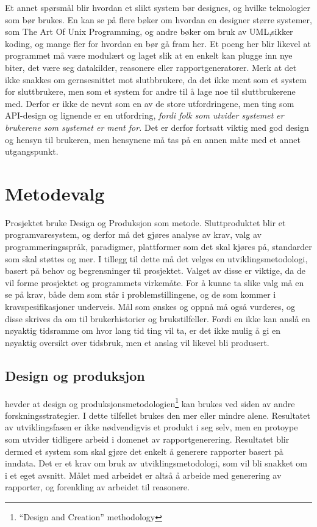 \documentclass[11pt]{article}
\begin{document}
Et annet spørsmål blir hvordan et slikt system bør designes, og hvilke teknologier som bør brukes. En kan se på flere bøker om hvordan en designer større systemer, som The Art Of Unix Programming\cite{taoup}, og andre bøker om bruk av UML\cite{Larman2005},sikker koding\cite{certguide}, og mange fler for hvordan en bør gå fram her. Et poeng her blir likevel at programmet må være modulært og laget slik at en enkelt kan plugge inn nye biter, det være seg datakilder, reasonere eller rapportgeneratorer. Merk at det ikke snakkes om gernsesnittet mot slutbbrukere, da det ikke ment som et system for sluttbrukere, men som et system for andre til å lage noe til sluttbrukerene med. Derfor er ikke de nevnt som en av de store utfordringene, men ting som API-design og lignende er en utfordring, \emph{fordi folk som utvider systemet er brukerene som systemet er ment for.} Det er derfor fortsatt viktig med god design og hensyn til brukeren, men hensynene må tas på en annen måte med et annet utgangspunkt.

\section{Metodevalg}
Prosjektet bruke Design og Produksjon som metode.
Sluttproduktet blir et programvaresystem, og derfor må det gjøres analyse av krav, valg av programmeringsspråk, paradigmer, plattformer som det skal kjøres på, standarder som skal støttes og mer.
I tillegg til dette må det velges en utviklingsmetodologi, basert på behov og begrensninger til prosjektet.
Valget av disse er viktige, da de vil forme prosjektet og programmets virkemåte.
For å kunne ta slike valg må en se på krav, både dem som står i problemstillingene, og de som kommer i kravspesifikasjoner underveis.
Mål som ønskes og oppnå må også vurderes, og disse skrives da om til brukerhistorier og brukstilfeller.
Fordi en ikke kan anslå en nøyaktig tidsramme om hvor lang tid ting vil ta, er det ikke mulig å gi en nøyaktig oversikt over tidsbruk, men et anslag vil likevel bli produsert.

\subsection{Design og produksjon}
\cite[p.111]{Oates2006} hevder at design og produksjonsmetodologien\footnote{``Design and Creation'' methodology} kan brukes ved siden av andre forskningsstrategier. I dette tilfellet brukes den mer eller mindre alene.
Resultatet av utviklingsfasen er ikke nødvendigvis et produkt i seg selv, men en protoype som utvider tidligere arbeid i domenet av rapportgenerering. Resultatet blir dermed et system som skal gjøre det enkelt å generere rapporter basert på inndata.
Det er et krav om bruk av utviklingsmetodologi, som vil bli snakket om i et eget avsnitt.
Målet med arbeidet er altså å arbeide med generering av rapporter, og forenkling av arbeidet til reasonere.
\end{document}
